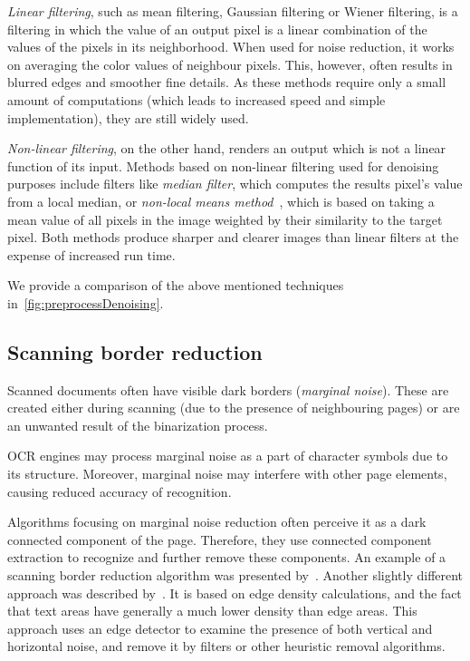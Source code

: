 \emph{Linear filtering}, such as mean filtering, Gaussian filtering or Wiener filtering, is a filtering in which the value of an output pixel is a linear combination of the values of the pixels in its neighborhood. When used for noise reduction, it works on averaging the color values of neighbour pixels. This, however, often results in blurred edges and smoother fine details. As these methods require only a small amount of computations (which leads to increased speed and simple implementation), they are still widely used.

\emph{Non-linear filtering}, on the other hand, renders an output which is not a linear function of its input. Methods based on non-linear filtering used for denoising purposes include filters like \emph{median filter}, which computes the results pixel's value from a local median, or \emph{non-local means method}~\citep{nonLocalMeans}, which is based on taking a mean value of all pixels in the image weighted by their similarity to the target pixel. Both methods produce sharper and clearer images than linear filters at the expense of increased run time.

We provide a comparison of the above mentioned techniques in~\cref{fig:preprocessDenoising}.

\subsection{Scanning border reduction}

Scanned documents often have visible dark borders (\emph{marginal noise}). These are created either during scanning (due to the presence of neighbouring pages) or are an unwanted result of the binarization process. 

OCR engines may process marginal noise as a part of character symbols due to its structure. Moreover, marginal noise may interfere with other page elements, causing reduced accuracy of recognition.

Algorithms focusing on marginal noise reduction often perceive it as a dark connected component of the page. Therefore, they use connected component extraction to recognize and further remove these components. An example of a scanning border reduction algorithm was presented by~\citet{marginalNoiseWindow}. Another slightly different approach was described by~\citet{marginalNoiseEdge}. It is based on edge density calculations, and the fact that text areas have generally a much lower density than edge areas. This approach uses an edge detector to examine the presence of both vertical and horizontal noise, and remove it by filters or other heuristic removal algorithms.

